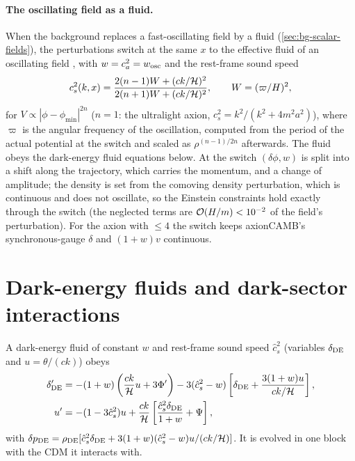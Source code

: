 \paragraph*{The oscillating field as a fluid.} When the background replaces a fast-oscillating field by a fluid
(\cref{sec:bg-scalar-fields}), the perturbations switch at the same $x$ to the effective fluid of an oscillating
field \cite{Poulin2018}, with $w=c_a^2=w_{\rm osc}$ and the rest-frame sound speed
\begin{equation}
c_s^2(k,x)=\frac{2(n-1)W+(ck/\mathcal{H})^2}{2(n+1)W+(ck/\mathcal{H})^2},\qquad W=(\varpi/H)^2,
\end{equation}
for $V\propto|\phi-\phi_{\min}|^{2n}$ ($n=1$: the ultralight axion, $c_s^2=k^2/(k^2+4m^2a^2)$), where $\varpi$ is the
angular frequency of the oscillation, computed from the period of the actual potential at the switch and scaled as
$\rho^{(n-1)/2n}$ afterwards. The fluid obeys the dark-energy fluid equations below. At the switch $(\delta\phi,w)$ is
split into a shift along the trajectory, which carries the momentum, and a change of amplitude; the density is set
from the comoving density perturbation, which is continuous and does not oscillate, so the Einstein constraints hold
exactly through the switch (the neglected terms are $\mathcal{O}(H/m)<10^{-2}$ of the field's perturbation). For the axion
with  $\le4$ the switch keeps axionCAMB's synchronous-gauge $\delta$ and $(1+w)v$ continuous.

\section{Dark-energy fluids and dark-sector interactions}\label{sec:ext-fluids}

A dark-energy fluid of constant $w$ and rest-frame sound speed $\hat c_s^2$ (variables $\delta_{\rm DE}$ and
$u=\theta/(ck)$) obeys
\begin{align}
\delta_{\rm DE}'&=-(1+w)\left(\frac{ck}{\mathcal{H}}u+3\Phi'\right)-3(\hat c_s^2-w)\left[\delta_{\rm DE}+\frac{3(1+w)u}{ck/\mathcal{H}}\right],\\
u'&=-(1-3\hat c_s^2)u+\frac{ck}{\mathcal{H}}\left[\frac{\hat c_s^2\delta_{\rm DE}}{1+w}+\Psi\right],
\end{align}
with $\delta p_{\rm DE}=\rho_{\rm DE}[\hat c_s^2\delta_{\rm DE}+3(1+w)(\hat c_s^2-w)u/(ck/\mathcal{H})]$. It is evolved in one block
with the CDM it interacts with.

